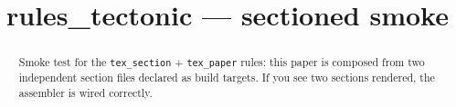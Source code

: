 \documentclass{article}
\title{rules\_tectonic — sectioned smoke}
\begin{document}
\maketitle

\begin{abstract}
Smoke test for the \texttt{tex\_section} + \texttt{tex\_paper}
rules: this paper is composed from two independent section files
declared as build targets. If you see two sections rendered,
the assembler is wired correctly.
\end{abstract}
\end{document}

